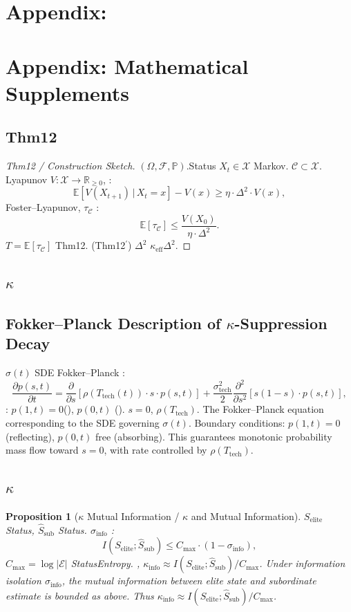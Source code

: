 \documentclass[11pt,a4paper]{article}
\newtheorem{proposition}[theorem]{Proposition}
\theoremstyle{definition}
\newcommand{\coupling}{\kappa}
\newcommand{\suppress}{\sigma}
\newcommand{\R}{\mathbb{R}}
\newcommand{\given}{\,|\,}
\newcommand{\bracket}[1]{\left[#1\right]}
\begin{document}
\section{Appendix:}
\section{Appendix: Mathematical Supplements}
\subsection{Thm12}
\begin{proof}[Thm12 / Construction Sketch]
 $(\Omega, \mathcal{F}, \mathbb{P})$.Status $X_t \in \mathcal{X}$ Markov.
 $\mathcal{C} \subset \mathcal{X}$.
 Lyapunov $V: \mathcal{X} \to \R_{\geq 0}$, : 
\[
\mathbb{E}[V(X_{t+1}) \given X_t = x] - V(x) \geq \eta \cdot \Delta^2 \cdot V(x),
\]
 Foster--Lyapunov, $\tau_{\mathcal{C}}$ : 
\[
\mathbb{E}[\tau_{\mathcal{C}}] \leq \frac{V(X_0)}{\eta \cdot \Delta^2}.
\]
 $T = \mathbb{E}[\tau_{\mathcal{C}}]$ Thm12.
(Thm12$^\prime$) $\Delta^2$ $\coupling_{\text{eff}} \Delta^2$.
\end{proof}
\subsection{$\coupling$}
\subsection{Fokker--Planck Description of $\coupling$-Suppression Decay}
$\suppress(t)$ SDE Fokker--Planck : 
\[
\frac{\partial p(s, t)}{\partial t} =
 \frac{\partial}{\partial s}\bracket{\rho(T_{\text{tech}}(t)) \cdot s \cdot p(s, t)}
 + \frac{\sigma_{\text{tech}}^2}{2}
 \frac{\partial^2}{\partial s^2}\bracket{s(1-s) \cdot p(s, t)},
\]
: $p(1, t) = 0$(), $p(0, t)$ ().
 $s=0$, $\rho(T_{\text{tech}})$.
The Fokker--Planck equation corresponding to the SDE governing $\suppress(t)$.
Boundary conditions: $p(1, t) = 0$ (reflecting), $p(0, t)$ free (absorbing).
This guarantees monotonic probability mass flow toward $s=0$, with rate controlled
by $\rho(T_{\text{tech}})$.
\subsection{$\coupling$}
\begin{proposition}[$\coupling$ Mutual Information / $\coupling$ and Mutual Information]
\label{prop:mi}
 $S_{\text{elite}}$ Status, $\widehat{S}_{\text{sub}}$ Status.
 $\suppress_{\text{info}}$ : 
\[
I(S_{\text{elite}}; \widehat{S}_{\text{sub}}) \leq
 C_{\text{max}} \cdot (1 - \suppress_{\text{info}}),
\]
 $C_{\text{max}} = \log|\mathcal{E}|$ StatusEntropy.
, $\coupling_{\text{info}} \approx I(S_{\text{elite}}; \widehat{S}_{\text{sub}}) / C_{\text{max}}$.
Under information isolation $\suppress_{\text{info}}$, the mutual information between
elite state and subordinate estimate is bounded as above. Thus
$\coupling_{\text{info}} \approx I(S_{\text{elite}}; \widehat{S}_{\text{sub}}) / C_{\text{max}}$.
\end{proposition}
\end{document}
